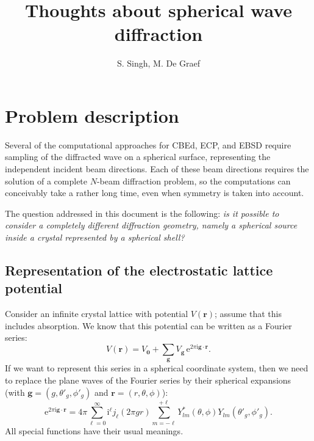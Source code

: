 \documentclass[11pt]{amsart}
\title{Thoughts about spherical wave diffraction}
\author{S. Singh, M. De Graef}
\begin{document}
\maketitle

\section{Problem description}
Several of the computational approaches for CBEd, ECP, and EBSD require sampling of 
the diffracted wave on a spherical surface, representing the independent incident 
beam directions.  Each of these beam directions requires the solution of a complete $N$-beam diffraction 
problem, so the computations can conceivably take a rather long time, even when symmetry is 
taken into account.

The question addressed in this document is the following: \textit{is it possible to consider a 
completely different diffraction geometry, namely a spherical source inside a crystal 
represented by a spherical shell?}


\subsection{Representation of the electrostatic lattice potential}
Consider an infinite crystal lattice with potential $V(\mathbf{r})$; assume that this includes absorption.
We know that this potential can be written as a Fourier series:
\begin{equation}
	V(\mathbf{r}) = V_{\mathbf{0}}+\sum_{\mathbf{g}} V_{\mathbf{g}}\,\mathrm{e}^{2\pi\mathrm{i}\mathbf{g}\cdot\mathbf{r}}.
\end{equation}
If we want to represent this series in a spherical coordinate system, then we need to replace the 
plane waves of the Fourier series by their spherical expansions (with $\mathbf{g}=(g,\theta'_g,\phi'_g)$
and $\mathbf{r}=(r,\theta,\phi)$):
\begin{equation}
	\mathrm{e}^{2\pi\mathrm{i}\mathbf{g}\cdot\mathbf{r}} = 
	4\pi \sum_{\ell=0}^{\infty} \mathrm{i}^{\ell}j_{\ell}(2\pi gr)\sum_{m=-\ell}^{+\ell} Y^{\ast}_{lm}(\theta,\phi)Y_{lm}(\theta'_g,\phi'_g).
\end{equation}
All special functions have their usual meanings.
\end{document}
